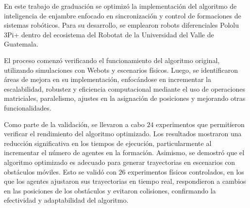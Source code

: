 En este trabajo de graduación se optimizó la implementación del algoritmo de inteligencia de enjambre enfocado en sincronización y control de formaciones de sistemas robóticos. Para su desarrollo, se emplearon robots diferenciales Pololu 3Pi+ dentro del ecosistema del Robotat de la Universidad del Valle de Guatemala.

El proceso comenzó verificando el funcionamiento del algoritmo original, utilizando simulaciones con Webots y escenarios físicos. Luego, se identificaron áreas de mejora en su implementación, enfocándose en incrementar la escalabilidad, robustez y eficiencia computacional mediante el uso de operaciones matriciales, paralelismo, ajustes en la asignación de posiciones y mejorando otras funcionalidades.

Como parte de la validación, se llevaron a cabo $24$ experimentos que permitieron verificar el rendimiento del algoritmo optimizado. Los resultados mostraron una reducción significativa en los tiempos de ejecución, particularmente al incrementar el número de agentes en la formación. Asimismo, se demostró que el algoritmo optimizado es adecuado para generar trayectorias en escenarios con obstáculos móviles. Esto se validó con $26$ experimentos físicos controlados, en los que los agentes ajustaron sus trayectorias en tiempo real, respondieron a cambios en las posiciones de los obstáculos y evitaron colisiones, confirmando la efectividad y adaptabilidad del algoritmo.

 